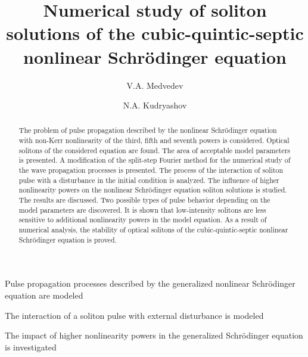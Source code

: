 \documentclass[preprint,12pt]{elsarticle}
\begin{document}
\begin{frontmatter}


\title{Numerical study of soliton solutions of the cubic-quintic-septic nonlinear Schr\"{o}dinger equation}



\author{V.A. Medvedev }
\author{N.A. Kudryashov}

\address{Department of Applied Mathematics, National Research Nuclear University MEPhI (Moscow Engineering Physics Institute), 31 Kashirskoe Shosse, 115409 Moscow, Russian Federation}


\begin{abstract}
The problem of pulse propagation described by the nonlinear Schr\"{o}dinger equation with non-Kerr nonlinearity of the third, fifth and seventh powers is considered. Optical solitons of the considered equation are found. The area of acceptable model parameters is presented. A modification of the split-step Fourier method for the numerical study of the wave propagation processes is presented. The process of the interaction of soliton pulse with a disturbance in the initial condition is analyzed. The influence of higher nonlinearity powers on the nonlinear Schr\"{o}dinger equation soliton solutions is studied. The results are discussed. Two possible types of pulse behavior depending on the model parameters are discovered. It is shown that low-intensity solitons are less sensitive to additional nonlinearity powers in the model equation. As a result of numerical analysis, the stability of optical solitons of the cubic-quintic-septic nonlinear Schr\"{o}dinger equation is proved.
\end{abstract}

\begin{graphicalabstract}
\end{graphicalabstract}

\begin{highlights}
\item Pulse propagation processes described by the generalized nonlinear Schr\"{o}dinger equation are modeled
\item The interaction of a soliton pulse with external disturbance is modeled
\item The impact of higher nonlinearity powers in the generalized Schr\"{o}dinger equation is investigated 
\end{highlights}


\end{frontmatter}
\end{document}
